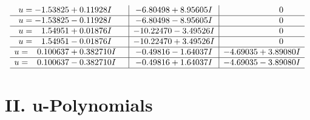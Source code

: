 \documentclass[1p]{elsarticle_modified}
\theoremstyle{definition}
\begin{document}
$$\begin{array}{c|c|c}
\begin{aligned}
u &= -1.53825 + 0.11928 I\end{aligned}
 & -6.80498 + 8.95605 I & \phantom{-0.000000 } 0 \\ \hline\begin{aligned}
u &= -1.53825 - 0.11928 I\end{aligned}
 & -6.80498 - 8.95605 I & \phantom{-0.000000 } 0 \\ \hline\begin{aligned}
u &= \phantom{-}1.54951 + 0.01876 I\end{aligned}
 & -10.22470 - 3.49526 I & \phantom{-0.000000 } 0 \\ \hline\begin{aligned}
u &= \phantom{-}1.54951 - 0.01876 I\end{aligned}
 & -10.22470 + 3.49526 I & \phantom{-0.000000 } 0 \\ \hline\begin{aligned}
u &= \phantom{-}0.100637 + 0.382710 I\end{aligned}
 & -0.49816 - 1.64037 I & -4.69035 + 3.89080 I \\ \hline\begin{aligned}
u &= \phantom{-}0.100637 - 0.382710 I\end{aligned}
 & -0.49816 + 1.64037 I & -4.69035 - 3.89080 I\\
 \hline 
 \end{array}$$\newpage
\newpage\renewcommand{\arraystretch}{1}
\centering \section*{ II. u-Polynomials}
\end{document}
